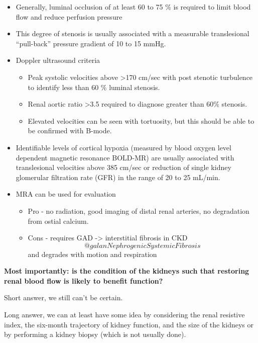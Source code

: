 \documentclass[
]{book}
\begin{document}
\begin{itemize}
\item
  Generally, luminal occlusion of at least 60 to 75 \% is required to
  limit blood flow and reduce perfusion pressure
\item
  This degree of stenosis is usually associated with a measurable
  translesional ``pull-back'' pressure gradient of 10 to 15 mmHg.
\item
  Doppler ultrasound criteria \citep{hoffmannRoleDuplexScanning1991, zierlerStrandnessDuplexScanning2016}

  \begin{itemize}
  \item
    Peak systolic velocities above \textgreater170 cm/sec with post stenotic
    turbulence to identify less than 60 \% luminal stenosis.
  \item
    Renal aortic ratio \textgreater3.5 required to diagnose greater than 60\%
    stenosis.
  \item
    Elevated velocities can be seen with tortuosity, but this should
    be able to be confirmed with B-mode.
  \end{itemize}
\item
  Identifiable levels of cortical hypoxia (measured by blood oxygen
  level dependent magnetic resonance BOLD-MR) are usually associated
  with translesional velocities above 385 cm/sec or reduction of
  single kidney glomerular filtration rate (GFR) in the range of 20 to
  25 mL/min.
\item
  MRA can be used for evaluation

  \begin{itemize}
  \item
    Pro - no radiation, good imaging of distal renal arteries, no
    degradation from ostial calcium.
  \item
    Cons - requires GAD -\textgreater{} interstitial fibrosis in CKD
    \[@galanNephrogenicSystemicFibrosis\] and degrades with motion
    and respiration
    \citep{nelsonGadoliniumenhancedBreathholdThreedimensional1999}
  \end{itemize}
\end{itemize}

\textbf{Most importantly: is the condition of the kidneys such that restoring
renal blood flow is likely to benefit function?}

Short answer, we still can't be certain.

Long answer, we can at least have some idea by considering the renal
resistive index, the six-month trajectory of kidney function, and the
size of the kidneys or by performing a kidney biopsy (which is not
usually done).
\end{document}
